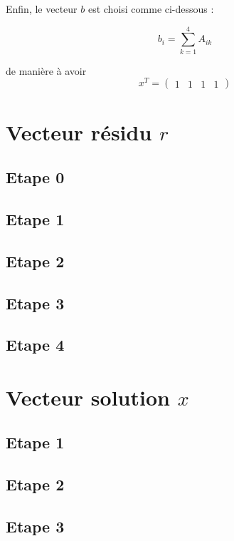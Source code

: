\documentclass[12,french]{report}
\begin{document}
Enfin, le vecteur $b$ est choisi comme ci-dessous :

$$b_i=\sum_{k=1}^4A_{ik}$$

de manière à avoir 
$$x^T=\left(\begin{array}{cccc}
1 & 1 & 1 & 1\end{array}\right)$$




\chapter{Vecteur résidu $r$} %

\section{Etape 0}

\section{Etape 1}

\section{Etape 2}

\section{Etape 3}

\section{Etape 4}

\chapter{Vecteur solution $x$} %

\section{Etape 1}

\section{Etape 2}

\section{Etape 3}
\end{document}

